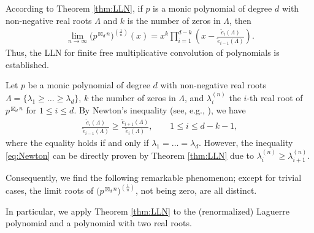 \documentclass[pdftex]{sigma}
\numberwithin{equation}{section}
\begin{document}
\begin{Remark}\label{rem:LLN_poly}
According to Theorem \ref{thm:LLN}, if $p$ is a monic polynomial of degree $d$ with non-negative real roots $\Lambda$ and $k$ is the number of zeros in $\Lambda$, then
\begin{align*}
\lim_{n\rightarrow \infty} \big(p^{\boxtimes_d n}\big)^{\left(\frac{1}{n}\right)}(x)=x^{k}\prod_{i=1}^{d-k} \left(x-  \frac{\widetilde{e}_i(\Lambda)}{\widetilde{e}_{i-1}(\Lambda)} \right).
\end{align*}
Thus, the LLN for finite free multiplicative convolution of polynomials is established.
\end{Remark}


\begin{Remark}
Let $p$ be a monic polynomial of degree $d$ with non-negative real roots $\Lambda=\{\lambda_{1} \ge \dots  \ge \lambda_d\}$, $k$ the number of zeros in $\Lambda$, and $\lambda_{i}^{(n)}$ the $i$-th real root of $p^{\boxtimes_d n}$ for $1\le i \le d$. By Newton's inequality (see, e.g., \cite{HLP34}), we have
\begin{align}\label{eq:Newton}
\frac{\widetilde{e}_i(\Lambda)}{\widetilde{e}_{i-1}(\Lambda)}\ge \frac{\widetilde{e}_{i+1}(\Lambda)}{\widetilde{e}_i(\Lambda)}, \qquad 1\le i \le d-k-1,
\end{align}
where the equality holds if and only if $\lambda_{1}= \dots = \lambda_{d}$. However, the inequality \eqref{eq:Newton} can be directly proven by Theorem \ref{thm:LLN} due to $\lambda_{i}^{(n)} \ge \lambda_{i+1}^{(n)}$.

Consequently, we find the following remarkable phenomenon; except for trivial cases, the limit roots of $\big(p^{\boxtimes_d n}\big)^{\left(\frac{1}{n}\right)}$, not being zero, are all distinct.
\end{Remark}

In particular, we apply Theorem \ref{thm:LLN} to the (renormalized) Laguerre polynomial and a polynomial with two real roots.
\end{document}
